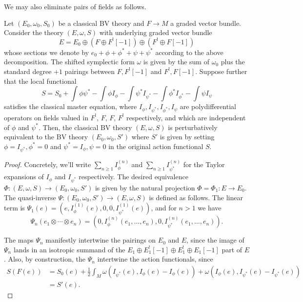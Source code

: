 \documentclass[10pt, oneside]{article}
\begin{document}
We may also eliminate pairs of fields as follows.

\begin{prop} 
\label{prop:BRSTdoublet}
Let $(E_0, \omega_0, S_0)$ be a classical BV theory and $F \to M$ a graded vector bundle.
Consider the theory $(E, \omega, S)$ with underlying graded vector bundle
\[
E = E_0 \oplus \left(F \oplus F^! [-1]\right) \oplus \left(F^! \oplus F[-1] \right)
\]
whose sections we denote by $e_0 + \phi + \phi^* + \psi + \psi^*$ according to the above decomposition. 
The shifted symplectic form $\omega$ is given by the sum of $\omega_0$ plus the standard degree $+1$ pairings between $F, F^! [-1]$ and $F^!, F[-1]$. 
Suppose further that the local functional
\[
S = S_0 + \int \phi \psi^* - \int \phi I_\phi - \int \psi^* I_{\psi^*} - \int \phi^* I_{\phi^*} - \int \psi I_{\psi}
\]
satisfies the classical master equation, where $I_{\phi}, I_{\psi^*}, I_{\phi^*}, I_{\psi}$ are polydifferential operators on fields valued in $F^!$, $F$, $F$, $F^!$ respectively, and which are independent of $\phi$ and $\psi^*$.
Then, the classical BV theory $(E, \omega, S)$ is perturbatively equivalent to the BV theory $(E_0, \omega_0, S')$ where $S'$ is given by setting $\phi = I_{\psi^*}, \phi^* = 0$ and $\psi^* = I_{\phi}, \psi = 0$ in the original action functional $S$. 
\end{prop}
\begin{proof}
Concretely, we'll write $\sum_{n \ge 1} I^{(n)}_\phi$ and $\sum_{n \ge 1} I^{(n)}_{\psi^*}$ for the Taylor expansions of $I_\phi$ and $I_{\psi^*}$ respectively.  
The desired equivalence $\Phi \colon (E, \omega, S) \to (E_0, \omega_0, S')$ is given by the natural projection $\Phi = \Phi_1 \colon E \to E_0$. 
The quasi-inverse $\Psi \colon (E_0, \omega_0, S') \to (E, \omega, S)$ is defined as follows.
The linear term is $\Psi_1(e) = (e, I^{(1)}_{\phi}(e),0,0, I^{(1)}_{\psi^*}(e))$, and for $n > 1$ we have 
\[\Psi_n(e_1\otimes \cdots \otimes e_n) = (0, I^{(n)}_{\phi}(e_1, \ldots, e_n), 0, I^{(n)}_{\psi^*}(e_1, \ldots, e_n)).\]

The maps $\Psi_n$ manifestly intertwine the pairings on $E_0$ and $E$, since the image of $\Psi_n$ lands in an isotropic summand of the $E_1\oplus E_1^![-1]\oplus E_1^!\oplus E_1[-1]$ part of $E$.  
Also, by construction, the $\Psi_n$ intertwine the action functionals, since
\begin{align*}
S(F(e)) &= S_0(e) + \frac{1}{2} \int_M \omega(I_{\psi^*}(e), I_\phi(e) - I_\phi(e)) + \omega(I_\phi (e), I_{\psi^*}(e) - I_{\psi^*}(e)) \\
&= S'(e).
\end{align*}
\end{proof}
\end{document}
